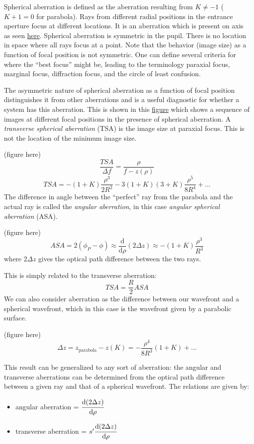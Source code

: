 \documentclass[12pt]{article}
\begin{document}
Spherical aberration is defined as the aberration resulting from $K\neq-1$
($K+1 = 0$ for parabola). Rays from different radial positions in the entrance
aperture focus at different locations. It is an aberration which is
present on axis as seen \href{http://astronomy.nmsu.edu/holtz/a535/html/diagrams/a535/spher.htm}
{here}. Spherical aberration is symmetric in the pupil. There is no location in
space where all rays focus at a point. Note that the behavior (image size) as a
function of focal position is not symmetric. One can define several criteria
for where the ``best focus'' might be, leading to the terminology paraxial
focus, marginal focus, diffraction focus, and the circle of least confusion.

The asymmetric nature of spherical aberration as a function of focal position
distinguishes it from other aberrations and is a useful diagnostic for whether
a system has this aberration. This is shown in this \href{http://astronomy.nmsu.edu/holtz/a535/html/diagrams/a535/z11.htm}
{figure} which shows a sequence of images at different focal positions in the
presence of spherical aberration. A \textit{transverse spherical aberration}
(TSA) is the image size at paraxial focus. This is not the location of the
minimum image size.

(figure here)
\[
    \frac{{TSA}}{\Delta{f}} = \frac{\rho}{f-z(\rho)}
    \]
\[
    {TSA} = -(1+K)\frac{\rho^{3}}{2R^{2}} -
    3(1+K)(3+K)\frac{\rho^{5}}{8R^{4}} + \ldots
    \]
The difference in angle between the ``perfect'' ray from the parabola
and the actual ray is called the \textit{angular aberration}, in this case
\textit{angular spherical aberration} (ASA).

(figure here)
\[
    {ASA} = 2(\phi_{P}-\phi) \approx
    \frac{\mathrm{d}}{\mathrm{d}\rho}(2\Delta{z}) \approx
    -(1+K)\frac{\rho^{3}}{R^{3}}
    \]
where $2\Delta{z}$ gives the optical path difference between the two rays.

This is simply related to the transverse aberration:
\[
    {TSA} = \frac{R}{2}{ASA}
    \]
We can also consider aberration as the difference between our wavefront and a
spherical wavefront, which in this case is the wavefront given by a parabolic
surface.

(figure here)
\[
    \Delta{z} = z_{\mathrm{parabola}} - z \left( K \right) =
    -\frac{\rho^{4}}{8R^{3}} \left( 1+K \right) + \ldots
    \]

This result can be generalized to any sort of aberration: the angular
and transverse aberrations can be determined from the optical path difference
between a given ray and that of a spherical wavefront. The relations are given
by:
\begin{itemize}
    \item angular aberration =
        $\cfrac{\mathrm{d}(2\Delta{z})}{\mathrm{d}\rho}$
    \item transverse aberration =
        $s' \cfrac{\mathrm{d}(2\Delta{z})}{\mathrm{d}\rho}$
\end{itemize}
\end{document}
